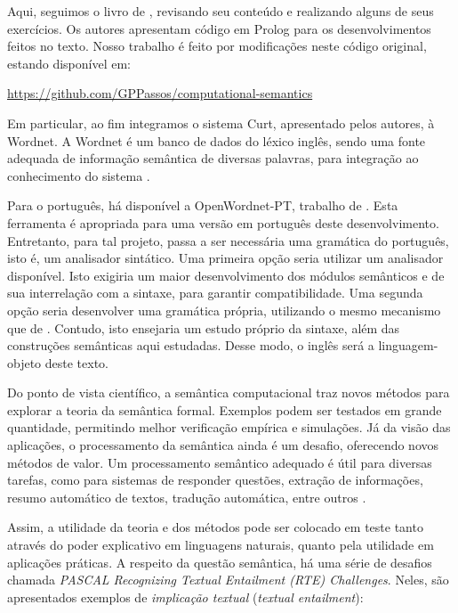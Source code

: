 
	Aqui, seguimos o livro de \citet{BlackburnBos:2005}, revisando seu conteúdo e realizando alguns de seus exercícios. Os autores apresentam código em Prolog para os desenvolvimentos feitos no texto. Nosso trabalho é feito por modificações neste código original, estando disponível em:
	
	\url{https://github.com/GPPassos/computational-semantics} \update
	
	Em particular, ao fim integramos o sistema Curt, apresentado pelos autores, à Wordnet. A Wordnet é um banco de dados do léxico inglês, sendo uma fonte adequada de informação semântica de diversas palavras, para integração ao conhecimento do sistema \citep{Fellbaum:wordnet}.
	
	Para o português, há disponível a OpenWordnet-PT, trabalho de \citet{wordnetPT}. Esta ferramenta é apropriada para uma versão em português deste desenvolvimento. Entretanto, para tal projeto, passa a ser necessária uma gramática do português, isto é, um analisador sintático. Uma primeira opção seria utilizar um analisador disponível. Isto exigiria um maior desenvolvimento dos módulos semânticos e de sua interrelação com a sintaxe, para garantir compatibilidade. Uma segunda opção seria desenvolver uma gramática própria, utilizando o mesmo mecanismo que de \citet{BlackburnBos:2005}. Contudo, isto ensejaria um estudo próprio da sintaxe, além das construções semânticas aqui estudadas. Desse modo, o inglês será a linguagem-objeto deste texto.  


	Do ponto de vista científico, a semântica computacional traz novos métodos para explorar a teoria da semântica formal. Exemplos podem ser testados em grande quantidade, permitindo melhor verificação empírica e simulações. Já da visão das aplicações, o processamento da semântica ainda é um desafio, oferecendo novos métodos de valor. Um processamento semântico adequado é útil para diversas tarefas, como para sistemas de responder questões, extração de informações, resumo automático de textos, tradução automática, entre outros \citep[pp.~1--2,10--14]{TextEntBook}.


	Assim, a utilidade da teoria e dos métodos pode ser colocado em teste tanto através do poder explicativo em linguagens naturais, quanto pela utilidade em aplicações práticas. A respeito da questão semântica, há uma série de desafios chamada \textit{PASCAL Recognizing Textual Entailment (RTE) Challenges}. Neles, são apresentados exemplos de  \textsl{implicação textual}  (\textit{textual entailment}):
	
